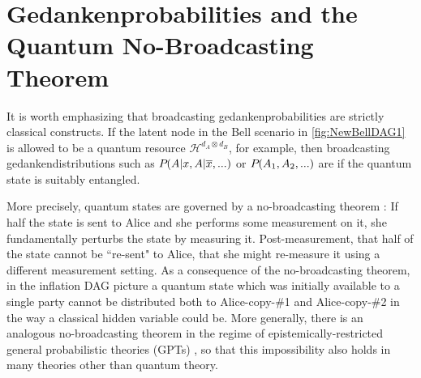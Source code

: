 \section{Gedankenprobabilities and the Quantum No-Broadcasting Theorem}\label{sec:classicallity}

It is worth emphasizing that broadcasting gedankenprobabilities %
are strictly classical constructs. If the latent node in the Bell scenario in \cref{fig:NewBellDAG1} is allowed to be a quantum resource $\mathcal{H}^{d_A\otimes d_B}$, for example, then broadcasting gedankendistributions such as ${P_{}}\lparen A|x , A|\overline{x},...\rparen$ or ${P_{}}\lparen A_1,A_2,...\rparen$ are  if the quantum state is suitably entangled.

More precisely, quantum states are governed by a no-broadcasting theorem \cite{NoCloningQuantum1996,NoCloningGeneral2006}: If half the state is sent to Alice and she performs some measurement on it, she fundamentally perturbs the state by measuring it. Post-measurement, that half of the state cannot be ``re-sent" to Alice, that she might re-measure it using a different measurement setting. As a consequence of the no-broadcasting theorem, in the inflation DAG picture a quantum state which was initially available to a single party cannot be distributed both to Alice-copy-\#1 and Alice-copy-\#2 in the way a classical hidden variable could be. More generally, there is an analogous no-broadcasting theorem in the regime of epistemically-restricted general probabilistic theories (GPTs) \cite{SpekkensToyTheory,NoCloningGeneral2006,Barnum2012GPT,Janotta2014GPT}, so that this impossibility also holds in many theories other than quantum theory.


